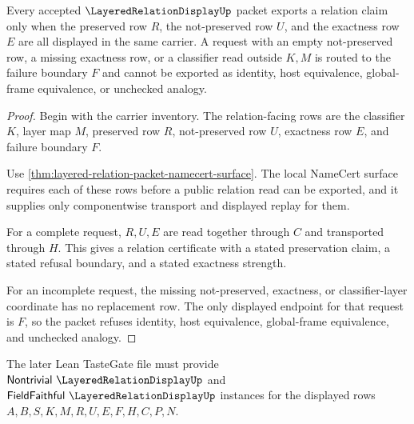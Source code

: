 \begin{theorem}
\label{thm:layered-relation-packet-preserve-refuse-exactness}
Every accepted $\LayeredRelationDisplayUp$ packet exports a relation claim only when the preserved row $R$, the not-preserved row $U$, and the exactness row $E$ are all displayed in the same carrier. A request with an empty not-preserved row, a missing exactness row, or a classifier read outside $K,M$ is routed to the failure boundary $F$ and cannot be exported as identity, host equivalence, global-frame equivalence, or unchecked analogy.
\end{theorem}
\begin{proof}
Begin with the carrier inventory. The relation-facing rows are the classifier $K$, layer map $M$, preserved row $R$, not-preserved row $U$, exactness row $E$, and failure boundary $F$.

Use \autoref{thm:layered-relation-packet-namecert-surface}. The local NameCert surface requires each of these rows before a public relation read can be exported, and it supplies only componentwise transport and displayed replay for them.

For a complete request, $R,U,E$ are read together through $C$ and transported through $H$. This gives a relation certificate with a stated preservation claim, a stated refusal boundary, and a stated exactness strength.

For an incomplete request, the missing not-preserved, exactness, or classifier-layer coordinate has no replacement row. The only displayed endpoint for that request is $F$, so the packet refuses identity, host equivalence, global-frame equivalence, and unchecked analogy.
\end{proof}



The later Lean TasteGate file must provide $\mathsf{Nontrivial}\ \LayeredRelationDisplayUp$ and $\mathsf{FieldFaithful}\ \LayeredRelationDisplayUp$ instances for the displayed rows $A,B,S,K,M,R,U,E,F,H,C,P,N$.



